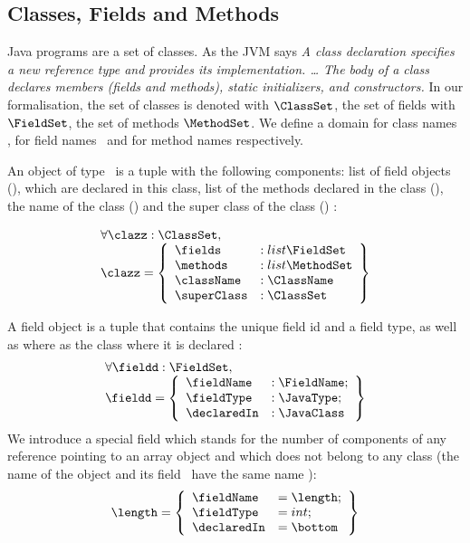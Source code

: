 
 \subsection{Classes, Fields and Methods}\label{clazz}
 Java programs are a set of classes. As the JVM says \textit{ A class declaration specifies a new reference type and provides its implementation. \ldots
 The body of a class declares members (fields and methods), static initializers, and constructors. }
 In our formalisation, the set of classes is denoted with $\ClassSet$, the set of fields with $\FieldSet$, the set of methods $\MethodSet$.
 We define a domain for class names \ClassName, for field names \FieldName \ and for method names \MethodName respectively.

 An object of type \ClassSet \ is a tuple with the following components: list of field objects (\fields), which are declared in this class,
 list of the methods declared in the class (\methods), the name of the class (\className)   and the super class of the class (\superClass)  :


 $$ \begin{array}{l}
          \forall  \clazz : \ClassSet , \\
         \clazz = \left\{\begin{array}{ll} \fields   & :    list \FieldSet \\
                                          \methods   & :    list \MethodSet\\
					  \className & :   \ClassName \\
					  \superClass& :   \ClassSet
                    \end{array} \right\}
   \end{array} $$

 A field object is a tuple that contains the unique field id and a field type, as well as where as the class where it is declared :  
 $$ \begin{array}{l} \forall \fieldd : \FieldSet, \\
       \fieldd = \left\{\begin{array}{ll}  \fieldName & : \FieldName;\\
                                     \fieldType &  : \JavaType; \\
				     \declaredIn & : \JavaClass
                     \end{array} \right\}
   \end{array} $$
 We introduce a special field which stands for the number of components of any reference pointing to an array object and which does not belong to any class
 (the name of the object and its field  \fieldName \ have the same name ):
 $$  \length =  \left\{\begin{array}{ll}  \fieldName & = \length;\\
                               \fieldType  & = int; \\
			       \declaredIn & = \bottom
                     \end{array} \right\}$$
 
